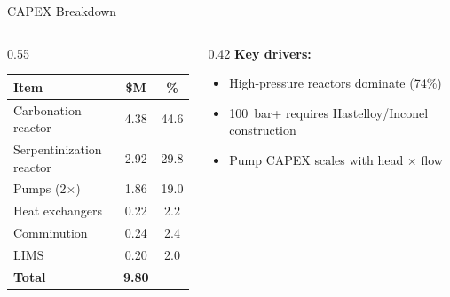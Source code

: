 \documentclass[aspectratio=169]{beamer}
\begin{document}
\begin{frame}{CAPEX Breakdown}

\begin{columns}[T]
\begin{column}{0.55\textwidth}
\begin{table}
\centering\small
\begin{tabular}{lcc}
\toprule
\textbf{Item} & \textbf{\$M} & \textbf{\%} \\
\midrule
Carbonation reactor & 4.38 & 44.6 \\
Serpentinization reactor & 2.92 & 29.8 \\
Pumps (2\(\times\)) & 1.86 & 19.0 \\
Heat exchangers & 0.22 & 2.2 \\
Comminution & 0.24 & 2.4 \\
LIMS & 0.20 & 2.0 \\
\midrule
\textbf{Total} & \textbf{9.80} & \\
\bottomrule
\end{tabular}
\end{table}
\end{column}
\begin{column}{0.42\textwidth}
\textbf{Key drivers:}
\begin{itemize}
\item High-pressure reactors dominate (\textcolor{cost}{74\%})
\item \SI{100}{bar}+ requires Hastelloy/Inconel construction
\item Pump CAPEX scales with head $\times$ flow
\end{itemize}
\end{column}
\end{columns}
\end{frame}
\end{document}
